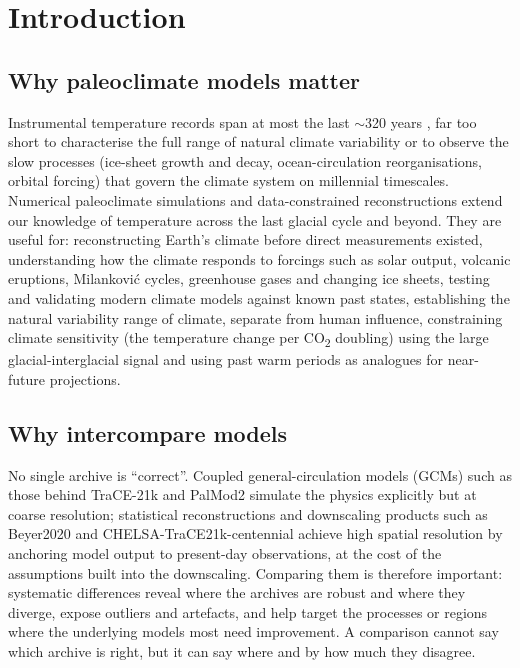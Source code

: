 \documentclass{isprs} %
\begin{document}
\maketitle

\pagestyle{plain}

\sloppy


\section{Introduction}

\subsection{Why paleoclimate models matter}
Instrumental temperature records span at most the last $\sim$320 years \cite{dwd_temp}, far too short to characterise the full range of natural climate variability or to observe the slow processes (ice-sheet growth and decay, ocean-circulation reorganisations, orbital forcing) that govern the climate system on millennial timescales. Numerical paleoclimate simulations and data-constrained reconstructions extend our knowledge of temperature across the last glacial cycle and beyond. They are useful for: reconstructing Earth's climate before direct measurements existed, understanding how the climate responds to forcings such as solar output, volcanic eruptions, Milankovi\'c cycles, greenhouse gases and changing ice sheets, testing and validating modern climate models against known past states, establishing the natural variability range of climate, separate from human influence, constraining climate sensitivity (the temperature change per CO\textsubscript{2} doubling) using the large glacial-interglacial signal and using past warm periods as analogues for near-future projections.

\subsection{Why intercompare models}
No single archive is ``correct''. Coupled general-circulation models (GCMs) such as those behind TraCE-21k and PalMod2 simulate the physics explicitly but at coarse resolution; statistical reconstructions and downscaling products such as Beyer2020 and CHELSA-TraCE21k-centennial achieve high spatial resolution by anchoring model output to present-day observations, at the cost of the assumptions built into the downscaling. Comparing them is therefore important: systematic differences reveal where the archives are robust and where they diverge, expose outliers and artefacts, and help target the processes or regions where the underlying models most need improvement. A comparison cannot say which archive is right, but it can say where and by how much they disagree.
\end{document}
